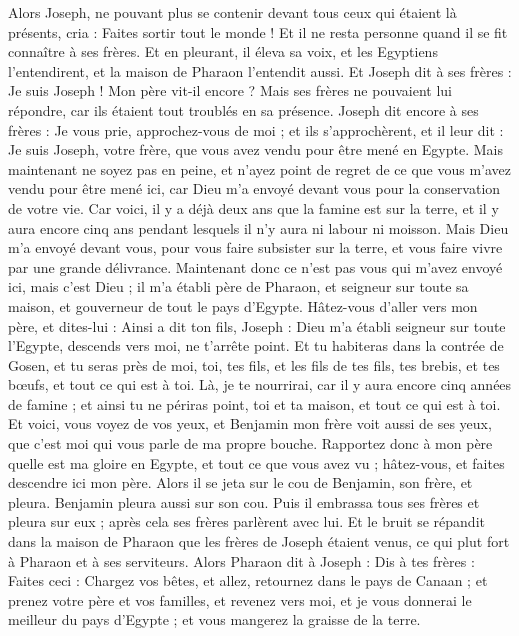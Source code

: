 \begin{multicols}{2}
\VerseOne{}Alors Joseph, ne pouvant plus se contenir devant tous ceux qui étaient là présents, cria : Faites sortir tout le monde ! Et il ne resta personne quand il se fit connaître à ses frères.
Et en pleurant, il éleva sa voix, et les Egyptiens l'entendirent, et la maison de Pharaon l'entendit aussi.
Et Joseph dit à ses frères : Je suis Joseph ! Mon père vit-il encore ? Mais ses frères ne pouvaient lui répondre, car ils étaient tout troublés en sa présence.
Joseph dit encore à ses frères : Je vous prie, approchez-vous de moi ; et ils s'approchèrent, et il leur dit : Je suis Joseph, votre frère, que vous avez vendu pour être mené en Egypte.
Mais maintenant ne soyez pas en peine, et n'ayez point de regret de ce que vous m'avez vendu pour être mené ici, car Dieu m'a envoyé devant vous pour la conservation de votre vie.
Car voici, il y a déjà deux ans que la famine est sur la terre, et il y aura encore cinq ans pendant lesquels il n'y aura ni labour ni moisson.
Mais Dieu m'a envoyé devant vous, pour vous faire subsister sur la terre, et vous faire vivre par une grande délivrance.
Maintenant donc ce n'est pas vous qui m'avez envoyé ici, mais c'est Dieu ; il m'a établi père de Pharaon, et seigneur sur toute sa maison, et gouverneur de tout le pays d'Egypte.
Hâtez-vous d'aller vers mon père, et dites-lui : Ainsi a dit ton fils, Joseph : Dieu m'a établi seigneur sur toute l'Egypte, descends vers moi, ne t'arrête point.
Et tu habiteras dans la contrée de Gosen, et tu seras près de moi, toi, tes fils, et les fils de tes fils, tes brebis, et tes bœufs, et tout ce qui est à toi.
Là, je te nourrirai, car il y aura encore cinq années de famine ; et ainsi tu ne périras point, toi et ta maison, et tout ce qui est à toi.
Et voici, vous voyez de vos yeux, et Benjamin mon frère voit aussi de ses yeux, que c'est moi qui vous parle de ma propre bouche.
Rapportez donc à mon père quelle est ma gloire en Egypte, et tout ce que vous avez vu ; hâtez-vous, et faites descendre ici mon père.
Alors il se jeta sur le cou de Benjamin, son frère, et pleura. Benjamin pleura aussi sur son cou.
Puis il embrassa tous ses frères et pleura sur eux ; après cela ses frères parlèrent avec lui.
Et le bruit se répandit dans la maison de Pharaon que les frères de Joseph étaient venus, ce qui plut fort à Pharaon et à ses serviteurs.
Alors Pharaon dit à Joseph : Dis à tes frères : Faites ceci : Chargez vos bêtes, et allez, retournez dans le pays de Canaan ;
et prenez votre père et vos familles, et revenez vers moi, et je vous donnerai le meilleur du pays d'Egypte ; et vous mangerez la graisse de la terre.

\end{multicols}
